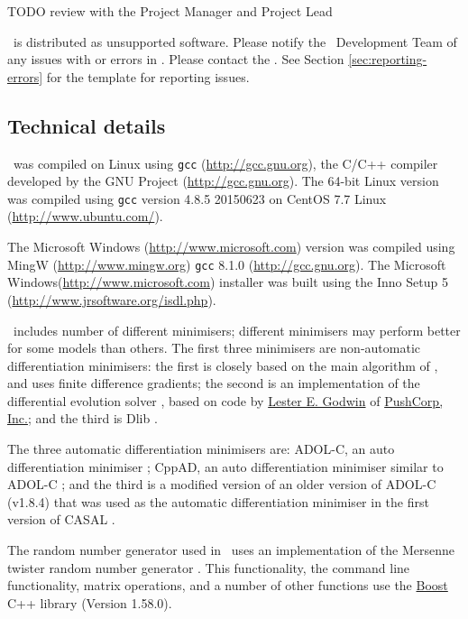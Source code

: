 TODO review with the Project Manager and Project Lead

\CNAME\ is distributed as unsupported software. Please notify the \CNAME\ Development Team of any issues with or errors in \CNAME. Please contact the \emaillink. See Section \ref{sec:reporting-errors} for the template for reporting issues.

\subsection{Technical details}\label{sec:tech}

\CNAME\ was compiled on Linux using \texttt{gcc} (\url{http://gcc.gnu.org}), the C/C++ compiler developed by the GNU Project (\url{http://gcc.gnu.org}). The 64-bit Linux  version was compiled using \texttt{gcc} version 4.8.5 20150623 on CentOS 7.7 Linux (\url{http://www.ubuntu.com/}).

The Microsoft Windows (\url{http://www.microsoft.com}) version was compiled using MingW (\url{http://www.mingw.org}) \texttt{gcc} 8.1.0 (\url{http://gcc.gnu.org}). The Microsoft Windows(\url{http://www.microsoft.com}) installer was built using the Inno Setup 5 (\url{http://www.jrsoftware.org/isdl.php}).

\CNAME\ includes number of different minimisers; different minimisers may perform better for some models than others. The first three minimisers are non-automatic differentiation minimisers: the first is closely based on the main algorithm of \cite{779}, and uses finite difference gradients; the second is an implementation of the differential evolution solver \citep{1442}, based on code by \href{mailto:<godwin@pushcorp.com>}{Lester E. Godwin} of \href{http://www.pushcorp.com}{PushCorp, Inc.}; and the third is Dlib \citep{dlib09}.

The three automatic differentiation minimisers are: ADOL-C, an auto differentiation minimiser \citep{walther1996adolc}; CppAD, an auto differentiation minimiser similar to ADOL-C \citep{wachter2006cppad}; and the third is a modified version of an older version of ADOL-C (v1.8.4) that was used as the automatic differentiation minimiser in the first version of CASAL \citep{1388}.

The random number generator used in \CNAME\ uses an implementation of the Mersenne twister random number generator \citep{796}. This functionality, the command line functionality, matrix operations, and a number of other functions use the \href{http://www.boost.org/}{Boost} C++ library (Version 1.58.0).

